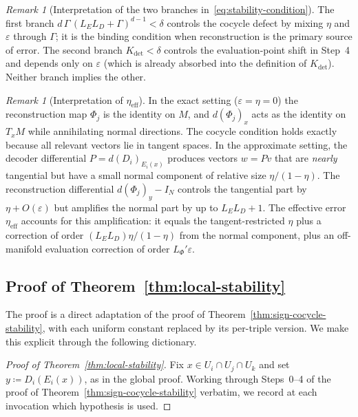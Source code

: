 \documentclass[11pt]{article}
\theoremstyle{plain}
\theoremstyle{definition}
\theoremstyle{remark}
\newtheorem{remark}[theorem]{Remark}
\begin{document}
\begin{appendices}
\begin{remark}[Interpretation of the two branches in~\eqref{eq:stability-condition}]
The first branch $d\,\Gamma\,(L_E L_D + \Gamma)^{d-1} < \delta$ controls the cocycle defect by mixing $\eta$ and $\varepsilon$ through $\Gamma$; it is the binding condition when reconstruction is the primary source of error. The second branch $K_{\det} < \delta$ controls the evaluation-point shift in Step~4 and depends only on $\varepsilon$ (which is already absorbed into the definition of $K_{\det}$). Neither branch implies the other.
\end{remark}

\begin{remark}[Interpretation of $\eta_{\mathrm{eff}}$]
In the exact setting ($\varepsilon = \eta = 0$) the reconstruction map $\Phi_j$ is the identity on $M$, and $d(\Phi_j)_x$ acts as the identity on $T_xM$ while annihilating normal directions. The cocycle condition holds exactly because all relevant vectors lie in tangent spaces. In the approximate setting, the decoder differential $P = d(D_i)_{E_i(x)}$ produces vectors $w = Pv$ that are \emph{nearly} tangential but have a small normal component of relative size $\eta/(1 - \eta)$. The reconstruction differential $d(\Phi_j)_y - I_N$ controls the tangential part by $\eta + O(\varepsilon)$ but amplifies the normal part by up to $L_E L_D + 1$. The effective error $\eta_{\mathrm{eff}}$ accounts for this amplification: it equals the tangent-restricted $\eta$ plus a correction of order $(L_E L_D)\eta/(1-\eta)$ from the normal component, plus an off-manifold evaluation correction of order $L_\Phi'\varepsilon$.
\end{remark}

\subsection{Proof of Theorem~\ref{thm:local-stability}}\label{proof:local-stability}

The proof is a direct adaptation of the proof of Theorem~\ref{thm:sign-cocycle-stability}, with each uniform constant replaced by its per-triple version. We make this explicit through the following dictionary.

\begin{proof}[Proof of Theorem~\ref{thm:local-stability}]
Fix $x \in U_i \cap U_j \cap U_k$ and set $y \coloneqq D_i(E_i(x))$, as in the global proof. Working through Steps~0--4 of the proof of Theorem~\ref{thm:sign-cocycle-stability} verbatim, we record at each invocation which hypothesis is used.


\end{proof}
\end{appendices}
\end{document}

